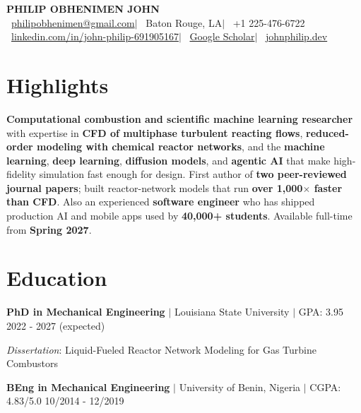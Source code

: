 \documentclass[letterpaper,10pt]{article}
\newcommand{\entry}[3]{\textbf{#1} $|$ #2 \hfill #3\par}
\newcommand{\sep}{\enspace$|$\enspace}
\begin{document}
\begin{center}
  {\fontsize{24}{28}\selectfont\bfseries PHILIP OBHENIMEN JOHN}\\[5pt]
  \faEnvelope\ \href{mailto:philipobhenimen@gmail.com}{philipobhenimen@gmail.com}\sep
  \faMapMarker\ Baton Rouge, LA\sep
  \faPhone\ +1 225-476-6722\\[2pt]
  \faLinkedinSquare\ \href{https://www.linkedin.com/in/john-philip-691905167/}{linkedin.com/in/john-philip-691905167}\sep
  \faGraduationCap\ \href{https://scholar.google.com/citations?user=fSWBA-IAAAAJ&hl=en}{Google Scholar}\sep
  \faGlobe\ \href{https://johnphilip.dev}{johnphilip.dev}
\end{center}

\section{Highlights}
\textbf{Computational combustion and scientific machine learning researcher} with expertise in
\textbf{CFD of multiphase turbulent reacting flows}, \textbf{reduced-order modeling with chemical reactor networks},
and the \textbf{machine learning}, \textbf{deep learning}, \textbf{diffusion models}, and \textbf{agentic AI} that make
high-fidelity simulation fast enough for design. First author of \textbf{two peer-reviewed journal papers}; built
reactor-network models that run \textbf{over 1,000$\times$ faster than CFD}. Also an experienced
\textbf{software engineer} who has shipped production AI and mobile apps used by \textbf{40,000+ students}.
Available full-time from \textbf{Spring 2027}.

\section{Education}
\entry{PhD in Mechanical Engineering}{Louisiana State University $|$ GPA: 3.95}{2022 - 2027 (expected)}
\textit{Dissertation}: Liquid-Fueled Reactor Network Modeling for Gas Turbine Combustors\par
\vspace{3pt}
\entry{BEng in Mechanical Engineering}{University of Benin, Nigeria $|$ CGPA: 4.83/5.0}{10/2014 - 12/2019}

\end{document}
